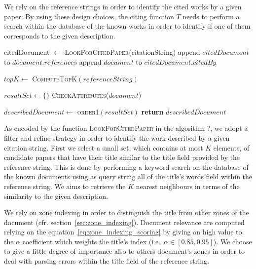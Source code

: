 We rely on the reference strings in order to identify the cited works by a given paper. By using these design choices, the citing function $T$ needs to perform a search within the database of the known works in order to identify if one of them corresponds to the given description.

\begin{algorithm}[t]
\caption{Citation graph building by using reference strings}\label{alg:citation_graph_building}
\begin{algorithmic}[1]
		\State citedDocument $\gets$ \textsc{LookForCitedPaper}(citationString)
			\State append $citedDocument$ to $document.references$
			\State append $document$ to $citedDocument.citedBy$
		\EndIf
	\EndFor
\EndFor
\EndProcedure
\Statex
{}

\State $topK \gets$ \textsc{ComputeTopK}$(referenceString)$

\State $resultSet \gets \{\}$
	\State \textsc{CheckAttributes}($document$)
\EndFor

\State $describedDocument \gets$ \textsc{order1}$(resultSet)$
\State \textbf{return} $describedDocument$

\EndFunction
\end{algorithmic}
\end{algorithm}

As encoded by the function \textsc{LookForCitedPaper} in the algorithm ?, we adopt a filter and refine strategy in order to identify the work described by a given citation string. First we select a small set, which contains at most $K$ elements, of candidate papers that have their title similar to the title field provided by the reference string. This is done by performing a keyword search on the database of the known documents using as query string all of the title's words field within the reference string. We aims to retrieve the $K$ nearest neighbours in terms of the similarity to the given description.

We rely on zone indexing in order to distinguish the title from other zones of the document (cfr. section~\ref{sec:zone_indexing}). Document relevance are computed relying on the equation~\ref{eq:zone_indexing_scoring} by giving an high value to the $\alpha$ coefficient which weights the title's index (i.e.\ $\alpha \in \left[0.85, 0.95\right]$). We choose to give a little degree of importance also to others document's zones in order to deal with parsing errors within the title field of the reference string.


